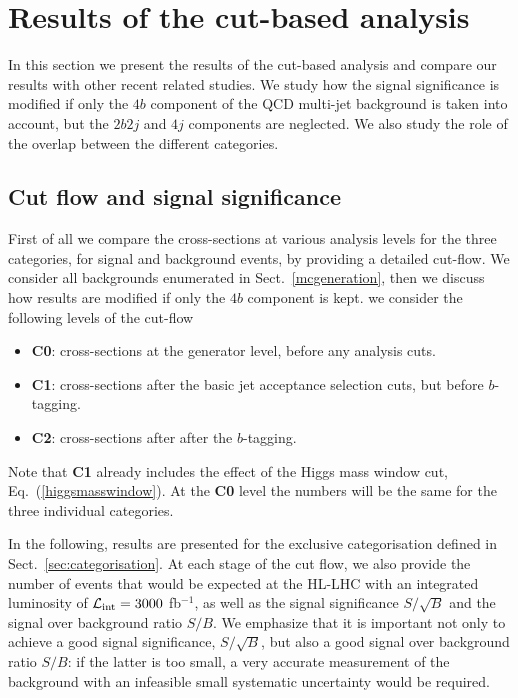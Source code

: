 
\section{Results of the cut-based analysis}

\label{sec:results}

In this section we present the results of the 
cut-based analysis and
compare our results with other recent related studies.
%
We study how the signal significance
is modified if only the $4b$ component of the
QCD multi-jet background is taken into account,
but the $2b2j$ and $4j$ components are neglected.
%
We also study the role of the overlap
between the different categories.


\subsection{Cut flow and signal significance}

First of all we compare the cross-sections at various
analysis levels for the three categories, for signal and background events,
by providing a detailed cut-flow.
%
We consider all backgrounds enumerated in Sect.~\ref{mcgeneration},
then we discuss how results are modified if only the $4b$
component is kept.
%
we consider the following levels of the cut-flow
\begin{itemize}
\item {\bf C0}: cross-sections at the generator
  level, before any analysis cuts.
\item {\bf C1}:  cross-sections after the basic jet acceptance selection
  cuts, but before $b$-tagging.
\item {\bf C2}: cross-sections after after the $b$-tagging.
\end{itemize}
Note that {\bf C1} already includes the effect of the Higgs mass
window cut, Eq.~(\ref{higgsmasswindow}).
%
At the {\bf C0} level the numbers will be the same
for the three individual categories.

In the following, results are presented for the exclusive
categorisation defined in Sect.~\ref{sec:categorisation}.
%
%
At each stage of the cut flow, we also provide the number
of events that would be expected at the HL-LHC with
an integrated luminosity of $\mathcal{L}_{\rm int}
=3000$ fb$^{-1}$,
as well as 
the signal significance $S/\sqrt{B}$ and the signal
over background ratio $S/B$.
%
We emphasize that it is important not only to achieve a good signal
significance, $S/\sqrt{B}$, but also a good signal over background ratio $S/B$:
if the latter is too small, a very accurate
measurement of the background with an infeasible small
systematic uncertainty would be required.


